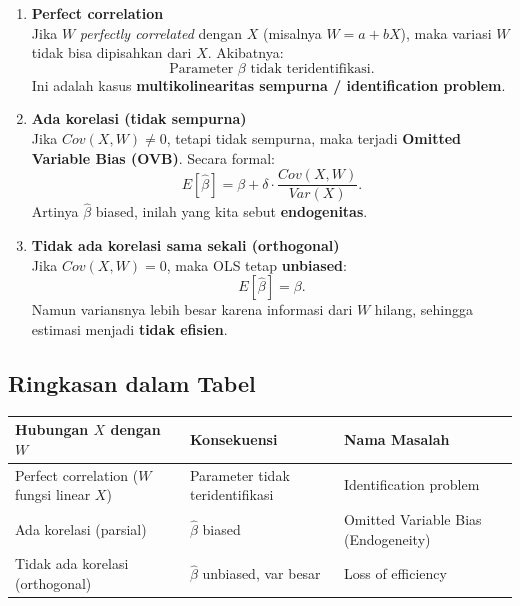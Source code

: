 \documentclass[]{article}
\begin{document}
\begin{enumerate}
    \item \textbf{Perfect correlation} \\
    Jika $W$ \textit{perfectly correlated} dengan $X$ (misalnya $W = a + bX$), maka variasi $W$ tidak bisa dipisahkan dari $X$. Akibatnya:
    \[
    \text{Parameter $\beta$ tidak teridentifikasi.}
    \]
    Ini adalah kasus \textbf{multikolinearitas sempurna / identification problem}.
    
    \item \textbf{Ada korelasi (tidak sempurna)} \\
    Jika $Cov(X, W) \neq 0$, tetapi tidak sempurna, maka terjadi \textbf{Omitted Variable Bias (OVB)}. 
    Secara formal:
    \[
    E[\hat{\beta}] = \beta + \delta \cdot \frac{Cov(X,W)}{Var(X)}.
    \]
    Artinya $\hat{\beta}$ biased, inilah yang kita sebut \textbf{endogenitas}.
    
    \item \textbf{Tidak ada korelasi sama sekali (orthogonal)} \\
    Jika $Cov(X, W) = 0$, maka OLS tetap \textbf{unbiased}:
    \[
    E[\hat{\beta}] = \beta.
    \]
    Namun variansnya lebih besar karena informasi dari $W$ hilang, sehingga estimasi menjadi \textbf{tidak efisien}.
\end{enumerate}

\subsection*{Ringkasan dalam Tabel}

\begin{center}
\begin{tabular}{@{}lll@{}}
\toprule
\textbf{Hubungan $X$ dengan $W$} & \textbf{Konsekuensi} & \textbf{Nama Masalah} \\ \midrule
Perfect correlation ($W$ fungsi linear $X$) & Parameter tidak teridentifikasi & Identification problem \\
Ada korelasi (parsial) & $\hat{\beta}$ biased & Omitted Variable Bias (Endogeneity) \\
Tidak ada korelasi (orthogonal) & $\hat{\beta}$ unbiased, var besar & Loss of efficiency \\ \bottomrule
\end{tabular}
\end{center}
\end{document}
